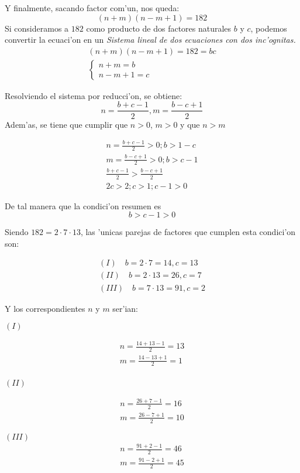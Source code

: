 \documentclass[12pt]{article}
\begin{document}
Y finalmente, sacando factor com'un, nos queda:
$$
(n+m)(n-m+1) = 182
$$
Si consideramos a $182$ como producto de dos factores naturales $b$ y $c$, podemos convertir la ecuaci'on en un \emph{Sistema lineal de dos ecuaciones con dos inc'ognitas.}
\begin{align*}
(n+m)(n-m+1) = 182 = bc \\
\left\{ 
\begin{array}{c}
n + m= b \\ 
n-m +1 = c
\end{array}
\right. 
\end{align*}
 
Resolviendo el sistema por reducci'on, se obtiene:
$$
   n = \frac{b+c-1}{2}, m = \frac{b-c+1}{2}
$$
Adem'as, se tiene que cumplir que $n > 0$, $m > 0$ y que $n > m$

\begin{align*}
n = \frac{b+c-1}{2} > 0; b > 1-c \\
m = \frac{b-c+1}{2} > 0; b > c -1 \\
\frac{b+c-1}{2} > \frac{b-c+1}{2} \\
2c > 2; c > 1; c - 1 > 0
\end{align*}

De tal manera que la condici'on resumen es
$$
b > c -1 > 0
$$

Siendo $182 = 2\cdot7\cdot13$,  las 'unicas parejas de factores que cumplen esta condici'on son:

\begin{align*}
(I)  \quad b= 2\cdot7 = 14, c = 13 \\
(II) \quad b = 2\cdot13 = 26, c = 7 \\
(III)\quad b = 7\cdot13 = 91, c= 2
\end{align*}


Y los correspondientes $n$ y $m$ ser'ian:


$(I)$

\begin{align*}
n=\frac{14+13-1}{2}=13\\
m = \frac{14-13+1}{2} = 1\\
\end{align*}


$(II)$

\begin{align*}
n = \frac{26+7-1}{2} = 16\\
m = \frac{26-7+1}{2} = 10
\end{align*}


$(III)$
\begin{align*}
n = \frac{91+2-1}{2} = 46\\
m = \frac{91-2+1}{2} = 45
\end{align*}
\end{document}
